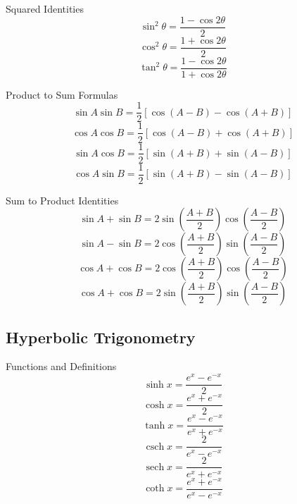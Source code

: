 \documentclass[12pt]{article}
\numberwithin{equation}{subsection}
\newcommand{\sinp}[1]{\sin\left( #1 \right)}
\newcommand{\cosp}[1]{\cos\left( #1 \right)}
\DeclareMathOperator{\sech}{sech}
\DeclareMathOperator{\csch}{csch}
\begin{document}
Squared Identities
\begin{equation}
\sin^2{\theta}=\frac{1-\cos{2\theta}}{2}
\end{equation}
\begin{equation}
\cos^2{\theta}=\frac{1+\cos{2\theta}}{2}
\end{equation}
\begin{equation}
\tan^2{\theta}=\frac{1-\cos{2\theta}}{1+\cos{2\theta}}
\end{equation}
\newpage

Product to Sum Formulas
\begin{equation}
\sin{A} \sin{B} = \frac{1}{2}[\cosp{A-B}-\cosp{A+B}]
\end{equation}
\begin{equation}
\cos{A} \cos{B} = \frac{1}{2}[\cosp{A-B}+\cosp{A+B}]
\end{equation}
\begin{equation}
\sin{A} \cos{B} = \frac{1}{2}[\sinp{A+B}+\sinp{A-B}]
\end{equation}
\begin{equation}
\cos{A} \sin{B} = \frac{1}{2}[\sinp{A+B}-\sinp{A-B}]
\end{equation}

Sum to Product Identities
\begin{equation}
\sin{A} + \sin{B} = 2\sinp{\frac{A+B}{2}} \cosp{\frac{A-B}{2}}
\end{equation}
\begin{equation}
\sin{A} - \sin{B} = 2\cosp{\frac{A+B}{2}} \sinp{\frac{A-B}{2}}
\end{equation}
\begin{equation}
\cos{A} + \cos{B} = 2\cosp{\frac{A+B}{2}} \cosp{\frac{A-B}{2}}
\end{equation}
\begin{equation}
\cos{A} + \cos{B} = 2\sinp{\frac{A+B}{2}} \sinp{\frac{A-B}{2}}
\end{equation}

\subsection{Hyperbolic Trigonometry}

Functions and Definitions
\begin{equation}
\sinh{x}=\frac{e^{x}-e^{-x}}{2}
\end{equation}
\begin{equation}
\cosh{x}=\frac{e^{x}+e^{-x}}{2}
\end{equation}
\begin{equation}
\tanh{x}=\frac{e^{x}-e^{-x}}{e^{x}+e^{-x}}
\end{equation}
\begin{equation}
\csch{x}=\frac{2}{e^{x}-e^{-x}}
\end{equation}
\begin{equation}
\sech{x}=\frac{2}{e^{x}+e^{-x}}
\end{equation}
\begin{equation}
\coth{x}=\frac{e^{x}+e^{-x}}{e^{x}-e^{-x}}
\end{equation}
\newpage
\end{document}
